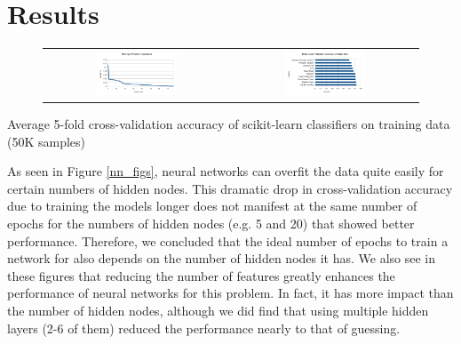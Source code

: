 \documentclass{article}
\begin{document}

\section{Results}
\label{results}

\begin{figure}[!h]
\centering
\begin{tabular}{cc}
\includegraphics[width=0.45\textwidth]{feature_importance} &
\includegraphics[width=0.45\textwidth]{crossval}
\end{tabular}
\end{figure}

Average 5-fold cross-validation accuracy of scikit-learn classifiers on training data (50K samples)

As seen in Figure \ref{nn_figs}, neural networks can overfit the data quite easily for certain numbers of hidden nodes.
This dramatic drop in cross-validation accuracy due to training the models longer does not manifest at the same number of epochs for the numbers of hidden nodes (e.g. 5 and 20) that showed better performance.
Therefore, we concluded that the ideal number of epochs to train a network for also depends on the number of hidden nodes it has.
We also see in these figures that reducing the number of features greatly enhances the performance of neural networks for this problem.
In fact, it has more impact than the number of hidden nodes, although we did find that using multiple hidden layers (2-6 of them) reduced the performance nearly to that of guessing.
\end{document}
